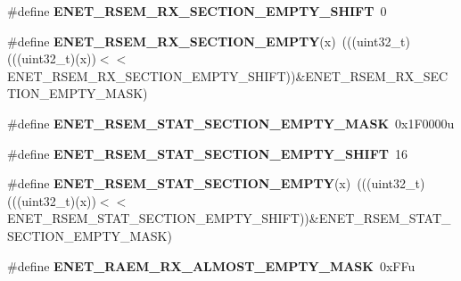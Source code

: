 \begin{DoxyCompactItemize}
\item 
\#define {\bfseries E\+N\+E\+T\+\_\+\+R\+S\+E\+M\+\_\+\+R\+X\+\_\+\+S\+E\+C\+T\+I\+O\+N\+\_\+\+E\+M\+P\+T\+Y\+\_\+\+S\+H\+I\+FT}~0\hypertarget{group__ENET__Register__Masks_gabd36b25a63e3ac019e1d718bb419f6b0}{}\label{group__ENET__Register__Masks_gabd36b25a63e3ac019e1d718bb419f6b0}

\item 
\#define {\bfseries E\+N\+E\+T\+\_\+\+R\+S\+E\+M\+\_\+\+R\+X\+\_\+\+S\+E\+C\+T\+I\+O\+N\+\_\+\+E\+M\+P\+TY}(x)~(((uint32\+\_\+t)(((uint32\+\_\+t)(x))$<$$<$E\+N\+E\+T\+\_\+\+R\+S\+E\+M\+\_\+\+R\+X\+\_\+\+S\+E\+C\+T\+I\+O\+N\+\_\+\+E\+M\+P\+T\+Y\+\_\+\+S\+H\+I\+FT))\&E\+N\+E\+T\+\_\+\+R\+S\+E\+M\+\_\+\+R\+X\+\_\+\+S\+E\+C\+T\+I\+O\+N\+\_\+\+E\+M\+P\+T\+Y\+\_\+\+M\+A\+SK)\hypertarget{group__ENET__Register__Masks_gac9332cfad9880fac4809423931950e77}{}\label{group__ENET__Register__Masks_gac9332cfad9880fac4809423931950e77}

\item 
\#define {\bfseries E\+N\+E\+T\+\_\+\+R\+S\+E\+M\+\_\+\+S\+T\+A\+T\+\_\+\+S\+E\+C\+T\+I\+O\+N\+\_\+\+E\+M\+P\+T\+Y\+\_\+\+M\+A\+SK}~0x1\+F0000u\hypertarget{group__ENET__Register__Masks_ga2c9b27e42f02634896fac03a23270054}{}\label{group__ENET__Register__Masks_ga2c9b27e42f02634896fac03a23270054}

\item 
\#define {\bfseries E\+N\+E\+T\+\_\+\+R\+S\+E\+M\+\_\+\+S\+T\+A\+T\+\_\+\+S\+E\+C\+T\+I\+O\+N\+\_\+\+E\+M\+P\+T\+Y\+\_\+\+S\+H\+I\+FT}~16\hypertarget{group__ENET__Register__Masks_ga4f6252fe71d82a4e4085cd0acf6893f8}{}\label{group__ENET__Register__Masks_ga4f6252fe71d82a4e4085cd0acf6893f8}

\item 
\#define {\bfseries E\+N\+E\+T\+\_\+\+R\+S\+E\+M\+\_\+\+S\+T\+A\+T\+\_\+\+S\+E\+C\+T\+I\+O\+N\+\_\+\+E\+M\+P\+TY}(x)~(((uint32\+\_\+t)(((uint32\+\_\+t)(x))$<$$<$E\+N\+E\+T\+\_\+\+R\+S\+E\+M\+\_\+\+S\+T\+A\+T\+\_\+\+S\+E\+C\+T\+I\+O\+N\+\_\+\+E\+M\+P\+T\+Y\+\_\+\+S\+H\+I\+FT))\&E\+N\+E\+T\+\_\+\+R\+S\+E\+M\+\_\+\+S\+T\+A\+T\+\_\+\+S\+E\+C\+T\+I\+O\+N\+\_\+\+E\+M\+P\+T\+Y\+\_\+\+M\+A\+SK)\hypertarget{group__ENET__Register__Masks_gadc4c382b7cc6428be891cdb2ed74a688}{}\label{group__ENET__Register__Masks_gadc4c382b7cc6428be891cdb2ed74a688}

\item 
\#define {\bfseries E\+N\+E\+T\+\_\+\+R\+A\+E\+M\+\_\+\+R\+X\+\_\+\+A\+L\+M\+O\+S\+T\+\_\+\+E\+M\+P\+T\+Y\+\_\+\+M\+A\+SK}~0x\+F\+Fu\hypertarget{group__ENET__Register__Masks_ga37982efb14bcd40ca10c696e7368dce2}{}\label{group__ENET__Register__Masks_ga37982efb14bcd40ca10c696e7368dce2}


\end{DoxyCompactItemize}
